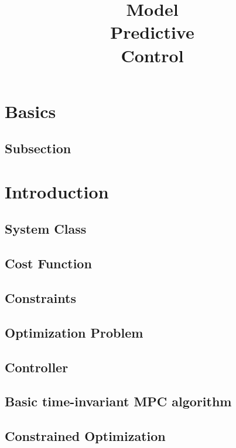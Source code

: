 \documentclass[english]{latex4ei/latex4ei_sheet}
\title{Model\\Predictive\\Control}
\begin{document}
\maketitle	%

\section{Basics}
\begin{sectionbox}

\subsection{Subsection}

\end{sectionbox}

\section{Introduction}
\begin{sectionbox}

\subsection{System Class}

\subsection{Cost Function}

\subsection{Constraints}

\subsection{Optimization Problem}

\subsection{Controller}

\subsection{Basic time-invariant MPC algorithm}

\subsection{Constrained Optimization}

\end{sectionbox}
\end{document}
